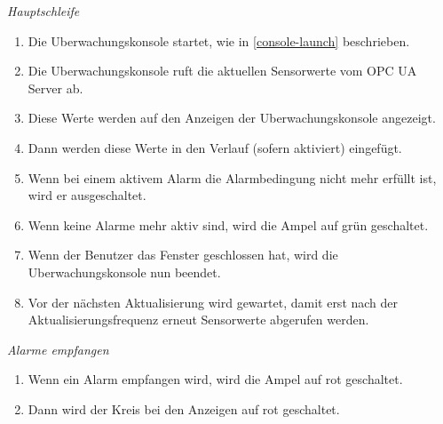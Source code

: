 \documentclass[parskip=full]{scrartcl}
\begin{document}
\emph{Hauptschleife}
\begin{enumerate}[noitemsep]
 \item Die \gls{Uberwachungskonsole} startet, wie in \ref{console-launch} beschrieben.
 \item Die \gls{Uberwachungskonsole} ruft die aktuellen Sensorwerte vom \gls{OPC UA Server} ab.
 \item Diese Werte werden auf den Anzeigen der \gls{Uberwachungskonsole} angezeigt.
 \item Dann werden diese Werte in den Verlauf (sofern aktiviert) eingefügt.
 \item Wenn bei einem aktivem Alarm die Alarmbedingung nicht mehr erfüllt ist, wird er ausgeschaltet.
 \item Wenn keine Alarme mehr aktiv sind, wird die Ampel auf grün geschaltet.
 \item Wenn der Benutzer das Fenster geschlossen hat, wird die \gls{Uberwachungskonsole} nun beendet.
 \item Vor der nächsten Aktualisierung wird gewartet, damit erst nach der Aktualisierungsfrequenz erneut Sensorwerte abgerufen werden.
\end{enumerate}
\emph{Alarme empfangen}
\begin{enumerate}[noitemsep]
 \item Wenn ein Alarm empfangen wird, wird die Ampel auf rot geschaltet.
 \item Dann wird der Kreis bei den Anzeigen auf rot geschaltet.
\end{enumerate}
\end{document}

